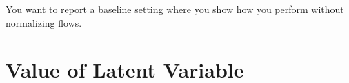 You want to report a baseline setting where you show how you perform without normalizing flows.






\section{Value of Latent Variable} 


